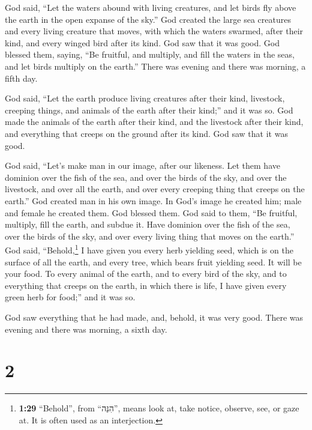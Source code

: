  God said, ``Let the waters abound with living creatures,
and let birds fly above the earth in the open expanse of the sky.''
 God created the large sea creatures and every living
creature that moves, with which the waters swarmed, after their kind,
and every winged bird after its kind. God saw that it was good.
 God blessed them, saying, ``Be fruitful, and multiply,
and fill the waters in the seas, and let birds multiply on the earth.''
 There was evening and there was morning, a fifth day.

 God said, ``Let the earth produce living creatures after
their kind, livestock, creeping things, and animals of the earth after
their kind;'' and it was so.  God made the animals of the
earth after their kind, and the livestock after their kind, and
everything that creeps on the ground after its kind. God saw that it was
good.

 God said, ``Let's make man in our image, after our
likeness. Let them have dominion over the fish of the sea, and over the
birds of the sky, and over the livestock, and over all the earth, and
over every creeping thing that creeps on the earth.'' 
God created man in his own image. In God's image he created him; male
and female he created them.  God blessed them. God said
to them, ``Be fruitful, multiply, fill the earth, and subdue it. Have
dominion over the fish of the sea, over the birds of the sky, and over
every living thing that moves on the earth.''  God said,
``Behold,\footnote{\textbf{1:29} ``Behold'', from ``הִנֵּה'', means look
  at, take notice, observe, see, or gaze at. It is often used as an
  interjection.} I have given you every herb yielding seed, which is on
the surface of all the earth, and every tree, which bears fruit yielding
seed. It will be your food.  To every animal of the
earth, and to every bird of the sky, and to everything that creeps on
the earth, in which there is life, I have given every green herb for
food;'' and it was so.

 God saw everything that he had made, and, behold, it was
very good. There was evening and there was morning, a sixth day.

\hypertarget{section-1}{%
\section{2}\label{section-1}}

